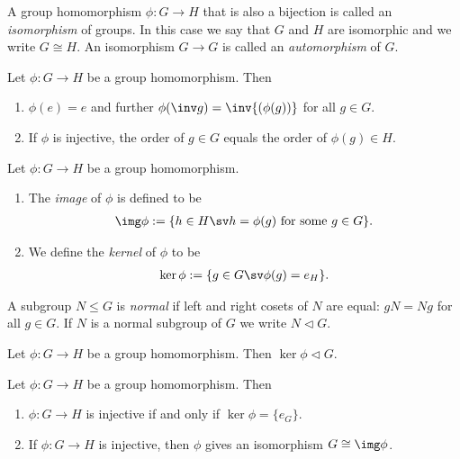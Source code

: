 \documentclass{article}
\begin{document}
\begin{definition}
    A group homomorphism $\phi:G\to H$ that is also a bijection is
    called an \emph{isomorphism} of groups. In this case we say that
    $G$ and $H$ are isomorphic and we write $G\cong H$. An
    isomorphism $G\to G$ is called an \emph{automorphism} of $G$.
\end{definition}

\setcounter{theorem}{4}
\begin{lemma}
    Let $\phi:G\to H$ be a group homomorphism. Then
    \begin{enumerate}
        \item $\phi(e)=e$ and further $\phi(\inv g)=\inv{(\phi(g))}$ for all $g\in G$.
        \item If $\phi$ is injective, the order of $g\in G$ equals the order of $\phi(g)\in H$.
    \end{enumerate}
\end{lemma}

\begin{definition}
    Let $\phi:G\to H$ be a group homomorphism.
    \begin{enumerate}
        \item The \emph{image} of $\phi$ is defined to be \begin{align*}
                  \img\phi := \{h\in H \sv h=\phi(g)\text{ for some }g\in G\}.
              \end{align*}
        \item We define the \emph{kernel} of $\phi$ to be \begin{align*}
                  \ker \phi := \{g\in G \sv \phi(g) = e_H\}.
              \end{align*}
    \end{enumerate}
\end{definition}

\begin{definition}
    A subgroup $N\leq G$ is \emph{normal} if left and right cosets
    of $N$ are equal: $gN=Ng$ for all $g\in G$. If $N$ is a normal
    subgroup of $G$ we write $N \triangleleft G$.
\end{definition}


\begin{proposition}
    Let $\phi:G\to H$ be a group homomorphism. Then $\ker\phi\triangleleft G$.
\end{proposition}

\begin{proposition}
    Let $\phi: G\to H$ be a group homomorphism. Then
    \begin{enumerate}
        \item $\phi:G\to H$ is injective if and only if $\ker\phi=\{e_G\}$.
        \item If $\phi:G\to H$ is injective, then $\phi$ gives an isomorphism $G\cong \img\phi$.
    \end{enumerate}
\end{proposition}
\end{document}
